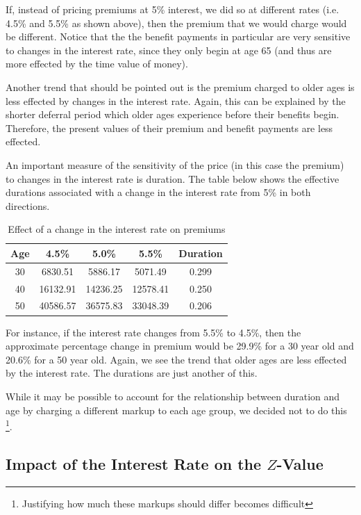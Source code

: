 \documentclass[12pt]{article}
\begin{document}
If, instead of pricing premiums at 5\% interest, we did so at different rates (i.e. 4.5\% and 5.5\% as shown above), then the premium that we would charge would be different. Notice that the the benefit payments in particular are very sensitive to changes in the interest rate, since they only begin at age 65 (and thus are more effected by the time value of money). 

Another trend that should be pointed out is the premium charged to older ages is less effected by changes in the interest rate. Again, this can be explained by the shorter deferral period which older ages experience before their benefits begin. Therefore, the present values of their premium and benefit payments are less effected.

An important measure of the sensitivity of the price (in this case the premium) to changes in the interest rate is duration. The table below shows the effective durations associated with a change in the interest rate from 5\% in both directions. 

\begin{table}[!ht] 
\centering 
\begin{tabular}{c c c c c}
\hline
Age & 4.5\% & 5.0\% & 5.5\% & Duration\\ [0.5ex] 
\hline  
30 & 6830.51 & 5886.17 & 5071.49 & 0.299\\ 
40 & 16132.91 & 14236.25 & 12578.41 & 0.250\\ 
50 & 40586.57 & 36575.83 & 33048.39 & 0.206\\  
\hline  
\end{tabular} 
\caption{Effect of a change in the interest rate on premiums}  
\label{table:durationTable} 
\end{table} 

For instance, if the interest rate changes from 5.5\% to 4.5\%, then the approximate percentage change in premium would be 29.9\% for a 30 year old and 20.6\% for a 50 year old. Again, we see the trend that older ages are less effected by the interest rate. The durations are just another of this.

While it may be possible to account for the relationship between duration and age by charging a different markup to each age group, we decided not to do this \footnote{Justifying how much these markups should differ becomes difficult}. 

\subsection{Impact of the Interest Rate on the $Z$-Value}
\end{document}
